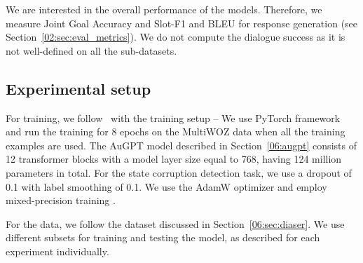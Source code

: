 We are interested in the overall performance of the models.
Therefore, we measure Joint Goal Accuracy and Slot-F1 and BLEU for response generation (see Section~\ref{02:sec:eval_metrics}).
We do not compute the dialogue success as it is not well-defined on all the sub-datasets.

\subsection{Experimental setup}
\label{06:experiments}
For training, we follow~\citep{kulhanek-etal-2021-augpt} with the training setup --
We use PyTorch framework \cite{pytorch} and run the training for 8 epochs on the MultiWOZ data when all the training examples are used.
The AuGPT model described in Section~\ref{06:augpt} consists of 12 transformer blocks with a model layer size equal to 768, having 124 million parameters in total.
For the state corruption detection task, we use a dropout of 0.1 with label smoothing of 0.1.
We use the AdamW optimizer \cite{DBLP:conf/iclr/LoshchilovH19} and employ mixed-precision training \cite{micikevicius2017mixed}.

For the data, we follow the dataset discussed in Section~\ref{06:sec:diaser}.
We use different subsets for training and testing the model, as described for each experiment individually.

